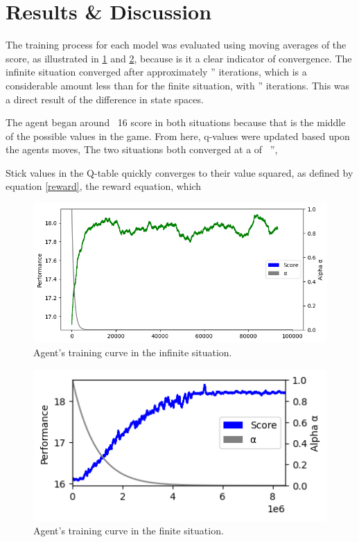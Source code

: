 \section{Results \& Discussion}

The training process for each model was evaluated using moving averages of the score, as illustrated in \ref{fig: Training curve - Infinite} and \ref{fig: Training curve - Finite}, because is it a clear indicator of convergence. The infinite situation converged after approximately '' iterations, which is a considerable amount less than for the finite situation, with '' iterations. This was a direct result of the difference in state spaces. 

The agent began around ~16 score in both situations because that is the middle of the possible values in the game. From here, q-values were updated based upon the agents moves, 
The two situations both converged at a  of  ~'', 

Stick values in the Q-table quickly converges to their value squared, as defined by equation \ref{reward}, the reward equation, which 

\begin{figure}[ht] 
    \centering
    \includegraphics[width=\singlefigure]{figures/infinite_training_curve.png}
    \caption{Agent's training curve in the infinite situation.}
    \label{fig: Training curve - Infinite} 
\end{figure}

\begin{figure}[ht] 
    \centering
    \includegraphics[width=\singlefigure]{figures/finite_training_curve.png}
    \caption{Agent's training curve in the finite situation.}
    \label{fig: Training curve - Finite} 
\end{figure}


